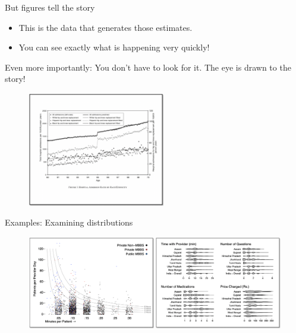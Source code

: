 \documentclass[aspectratio=169]{beamer}
\begin{document}
\begin{frame}{But figures tell the story}
	\begin{multicols}{2}	
		
		\begin{itemize}[<default overlay specification>]
			\item<1> This is the data that generates those estimates.
			\item<1> You can see exactly what is happening very quickly!
		\end{itemize}
	
	Even more importantly: You don't have to look for it. The eye is drawn to the story!
		
		\begin{figure}
			\centering
			\includegraphics[width=60mm]{img/Table2}
		\end{figure}
		
	\end{multicols}
\end{frame}


\begin{frame}{Examples: Examining distributions}
	
	\begin{figure}
		\centering
		\includegraphics[width=\linewidth]{img/Distribution}
	\end{figure}
	
\end{frame}
\end{document}
